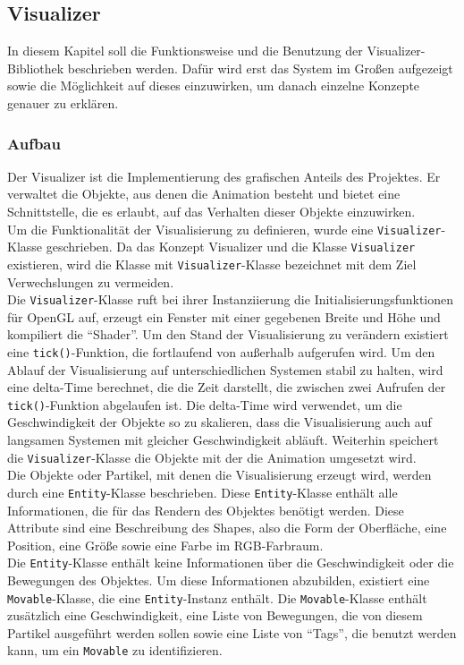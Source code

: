 \documentclass[11pt,a4paper]{article}
\begin{document}
\newpage
\subsection{Visualizer}
In diesem Kapitel soll die Funktionsweise und die Benutzung der Visualizer-Bibliothek beschrieben werden. Dafür wird erst das System im Großen aufgezeigt sowie die Möglichkeit auf dieses einzuwirken, um danach einzelne Konzepte genauer zu erklären.

\subsubsection{Aufbau}
Der Visualizer ist die Implementierung des grafischen Anteils des Projektes. Er verwaltet die Objekte, aus denen die Animation besteht und bietet eine Schnittstelle, die es erlaubt, auf das Verhalten dieser Objekte einzuwirken.\\
Um die Funktionalität der Visualisierung zu definieren, wurde eine \lstinline!Visualizer!-Klasse geschrieben. Da das Konzept Visualizer und die Klasse \lstinline!Visualizer! existieren, wird die Klasse mit \lstinline!Visualizer!-Klasse bezeichnet mit dem Ziel Verwechslungen zu vermeiden.\\
Die \lstinline!Visualizer!-Klasse ruft bei ihrer Instanziierung die Initialisierungsfunktionen für OpenGL auf, erzeugt ein Fenster mit einer gegebenen Breite und Höhe und kompiliert die ``Shader''. Um den Stand der Visualisierung zu verändern existiert eine \lstinline!tick()!-Funktion, die fortlaufend von außerhalb aufgerufen wird. Um den Ablauf der Visualisierung auf unterschiedlichen Systemen stabil zu halten, wird eine delta-Time berechnet, die die Zeit darstellt, die zwischen zwei Aufrufen der \lstinline!tick()!-Funktion abgelaufen ist. Die delta-Time wird verwendet, um die Geschwindigkeit der Objekte so zu skalieren, dass die Visualisierung auch auf langsamen Systemen mit gleicher Geschwindigkeit abläuft. Weiterhin speichert die \lstinline!Visualizer!-Klasse die Objekte mit der die Animation umgesetzt wird.\\
Die Objekte oder Partikel, mit denen die Visualisierung erzeugt wird, werden durch eine \lstinline!Entity!-Klasse beschrieben. Diese \lstinline!Entity!-Klasse enthält alle Informationen, die für das Rendern des Objektes benötigt werden. Diese Attribute sind eine Beschreibung des Shapes, also die Form der Oberfläche, eine Position, eine Größe sowie eine Farbe im RGB-Farbraum.\\
Die \lstinline!Entity!-Klasse enthält keine Informationen über die Geschwindigkeit oder die Bewegungen des Objektes. Um diese Informationen abzubilden, existiert eine \lstinline!Movable!-Klasse, die eine \lstinline!Entity!-Instanz enthält. Die \lstinline!Movable!-Klasse enthält zusätzlich eine Geschwindigkeit, eine Liste von Bewegungen, die von diesem Partikel ausgeführt werden sollen sowie eine Liste von ``Tags'', die benutzt werden kann, um ein \lstinline!Movable! zu identifizieren.\\
\end{document}
